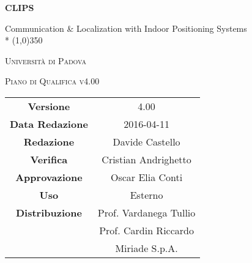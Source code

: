 \documentclass[a4paper,12pt]{article}
\author{Andrighetto Cristian, Castello Davide}
\date{27/12/2015}
\begin{document}
	\begin{titlepage}
		\centering
	{\huge\bfseries CLIPS\par}
	Communication \& Localization with Indoor Positioning Systems \\*
	\line(1,0){350} \\
	{\scshape\LARGE Università di Padova \par}
	\vspace{1cm}
	{\scshape\Large Piano di Qualifica v4.00 \par}
	\logo
	\newpage
		\begin{tabular}{c|c}
			{\hfill \textbf{Versione}} 			& 4.00 				\\
			{\hfill\textbf{Data Redazione}} 		& 2016-04-11	 		\\ 
			{\hfill\textbf{Redazione}} 			& Davide Castello 		\\ 
			{\hfill\textbf{Verifica}} 			& Cristian Andrighetto 		\\
			{\hfill\textbf{Approvazione}} 			& Oscar Elia Conti 		\\
			{\hfill\textbf{Uso}} 				& Esterno			\\
			{\hfill\textbf{Distribuzione}} 			& Prof. Vardanega Tullio	\\
									& Prof. Cardin Riccardo 	\\
									& Miriade S.p.A.
		\end{tabular}
	\end{titlepage}
	
	\newpage
	\pagestyle{myfront}
		
	
	\newpage
		\tableofcontents
	
	\newpage
		\listoftables
	
	\label{LastFrontPage}
	\newpage
		\pagestyle{mymain}
	
\newpage
	
\newpage
	
\newpage
	
\newpage
	
\newpage
	
\newpage
	
\newpage
	
\newpage
	
\newpage
	
\label{LastPage}
\end{document}
